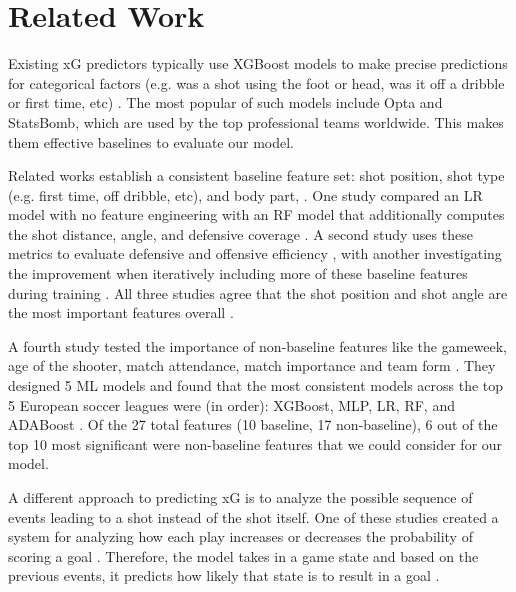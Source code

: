 \documentclass[11pt]{article}
\begin{document}
\section{Related Work}

Existing xG predictors typically use XGBoost models to make precise predictions for categorical factors (e.g. was a shot using the foot or head, was it off a dribble or first time, etc) \citep{StatsBombGlossary, Whitmore2023}. The most popular of such models include Opta and StatsBomb, which are used by the top professional teams worldwide. This makes them effective baselines to evaluate our model. 

Related works establish a consistent baseline feature set: shot position, shot type (e.g. first time, off dribble, etc), and body part, \citep{Fairchild2018, Bandara2024, Appiah2026}. One study compared an LR model with no feature engineering with an RF model that additionally computes the shot distance, angle, and defensive coverage \citep{Bandara2024}. A second study uses these metrics to evaluate defensive and offensive efficiency \citep{Fairchild2018}, with another investigating the improvement when iteratively including more of these baseline features during training \citep{Appiah2026}. All three studies agree that the shot position and shot angle are the most important features overall \citep{Fairchild2018,Bandara2024,Appiah2026}. 

A fourth study tested the importance of non-baseline features like the gameweek, age of the shooter, match attendance, match importance and team form \citep{Mead2023}. They designed 5 ML models and found that the most consistent models across the top 5 European soccer leagues were (in order): XGBoost, MLP, LR, RF, and ADABoost \citep{Mead2023}. Of the 27 total features (10 baseline, 17 non-baseline), 6 out of the top 10 most significant were non-baseline features \citep{Mead2023} that we could consider for our model. 

A different approach to predicting xG is to analyze the possible sequence of events leading to a shot instead of the shot itself. One of these studies created a system for analyzing how each play increases or decreases the probability of scoring a goal \citep{Decroos2019}. Therefore, the model takes in a game state and based on the previous events, it predicts how likely that state is to result in a goal \citep{Decroos2019}. 


\end{document}

